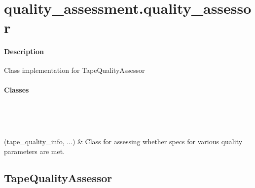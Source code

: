 \documentclass[letterpaper,10pt,english]{sphinxmanual}
\begin{document}
\chapter{quality\_assessment.quality\_assessor}
\label{\detokenize{generated/quality_assessment.quality_assessor:quality-assessment-quality-assessor}}\label{\detokenize{generated/quality_assessment.quality_assessor::doc}}\subsubsection*{Description}
\label{\detokenize{generated/quality_assessment.quality_assessor:module-quality_assessment.quality_assessor}}
\sphinxAtStartPar
Class implementation for TapeQualityAssessor
\subsubsection*{Classes}


\begin{savenotes}\sphinxatlongtablestart\begin{longtable}[c]{}
\hline

\endfirsthead

%
{}\\
\hline

\endhead

\hline
{}\\
\endfoot

\endlastfoot

\sphinxAtStartPar
{\hyperref[\detokenize{generated/quality_assessment.quality_assessor.TapeQualityAssessor:quality_assessment.quality_assessor.TapeQualityAssessor}]{}}(tape\_quality\_info, ...)
&
\sphinxAtStartPar
Class for assessing whether specs for various quality parameters are met.
\\
\hline
\end{longtable}\sphinxatlongtableend\end{savenotes}


\section{TapeQualityAssessor}
\label{\detokenize{generated/quality_assessment.quality_assessor.TapeQualityAssessor:tapequalityassessor}}\label{\detokenize{generated/quality_assessment.quality_assessor.TapeQualityAssessor::doc}}
\end{document}
